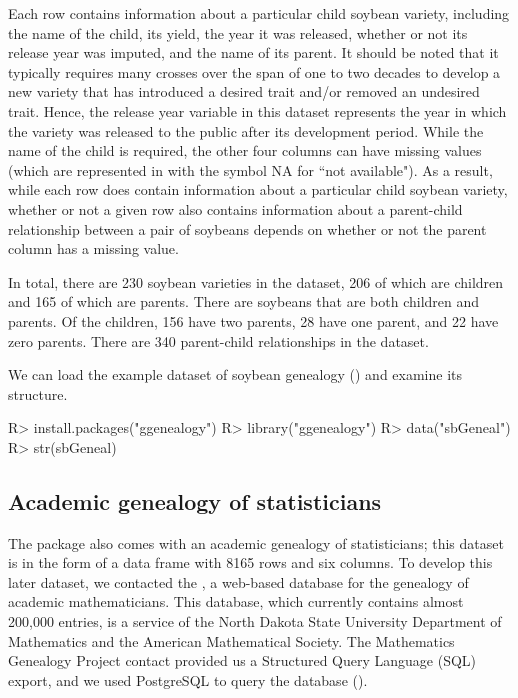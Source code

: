 \documentclass[article,shortnames]{jss}
\begin{document}
Each row contains information about a particular child soybean variety, including the name of the child, its yield, the year it was released, whether or not its release year was imputed, and the name of its parent. It should be noted that it typically requires many crosses over the span of one to two decades to develop a new variety that has introduced a desired trait and/or removed an undesired trait. Hence, the release year variable in this dataset represents the year in which the variety was released to the public after its development period. While the name of the child is required, the other four columns can have missing values (which are represented in  with the symbol NA for ``not available"). As a result, while each row does contain information about a particular child soybean variety, whether or not a given row also contains information about a parent-child relationship between a pair of soybeans depends on whether or not the parent column has a missing value.

In total, there are 230 soybean varieties in the dataset, 206 of which are children and 165 of which are parents. There are soybeans that are both children and parents. Of the children, 156 have two parents, 28 have one parent, and 22 have zero parents. There are 340 parent-child relationships in the dataset.

We can load the example dataset of soybean genealogy () and examine its structure. 

\begin{CodeChunk}
\begin{CodeInput}
R> install.packages("ggenealogy")
R> library("ggenealogy")
R> data("sbGeneal")
R> str(sbGeneal)
\end{CodeInput}
\end{CodeChunk}

\subsection{Academic genealogy of statisticians}
The  package also comes with an academic genealogy of statisticians; this dataset is in the form of a data frame with 8165 rows and six columns. To develop this later dataset, we contacted the \citealt{mgp}, a web-based database for the genealogy of academic mathematicians. This database, which currently contains almost 200,000 entries, is a service of the North Dakota State University Department of Mathematics and the American Mathematical Society. The Mathematics Genealogy Project contact provided us a Structured Query Language (SQL) export, and we used PostgreSQL to query the database (\citealt{psql}).
\end{document}
